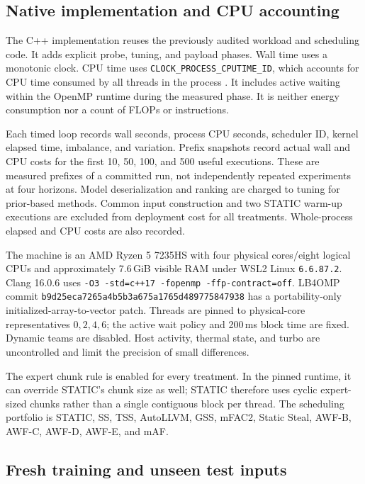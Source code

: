 \documentclass[conference]{IEEEtran}
\newcommand{\code}[1]{\texttt{#1}}
\begin{document}
\subsection{Native implementation and CPU accounting}

The C++ implementation reuses the previously audited workload and scheduling
code. It adds explicit probe, tuning, and payload phases. Wall time uses a
monotonic clock. CPU time uses \code{CLOCK\_PROCESS\_CPUTIME\_ID}, which
accounts for CPU time consumed by all threads in the process \cite{clock}.
It includes active waiting within the OpenMP runtime during the measured
phase. It is neither energy consumption nor a count of FLOPs or instructions.

Each timed loop records wall seconds, process CPU seconds, scheduler ID,
kernel elapsed time, imbalance, and variation. Prefix snapshots record actual
wall and CPU costs for the first 10, 50, 100, and 500 useful executions.
These are measured prefixes of a committed run, not independently repeated
experiments at four horizons. Model deserialization and ranking are charged
to tuning for prior-based methods. Common input construction and two STATIC
warm-up executions are excluded from deployment cost for all treatments.
Whole-process elapsed and CPU costs are also recorded.

The machine is an AMD Ryzen 5 7235HS with four physical cores/eight logical
CPUs and approximately 7.6\,GiB visible RAM under WSL2 Linux
\code{6.6.87.2}. Clang 16.0.6 uses \code{-O3 -std=c++17 -fopenmp
-ffp-contract=off}. LB4OMP commit
\code{b9d25eca7265a4b5b3a675a1765d489775847938} has a portability-only
initialized-array-to-vector patch. Threads are pinned to physical-core
representatives $0,2,4,6$; the active wait policy and 200\,ms block time are
fixed. Dynamic teams are disabled. Host activity, thermal state, and turbo
are uncontrolled and limit the precision of small differences.

The expert chunk rule is enabled for every treatment. In the pinned runtime,
it can override STATIC's chunk size as well; STATIC therefore uses cyclic
expert-sized chunks rather than a single contiguous block per thread.
The scheduling portfolio is STATIC, SS, TSS, AutoLLVM, GSS, mFAC2,
Static Steal, AWF-B, AWF-C, AWF-D, AWF-E, and mAF.

\subsection{Fresh training and unseen test inputs}
\end{document}
